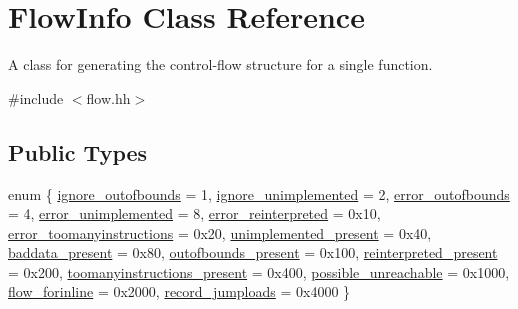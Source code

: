 \hypertarget{class_flow_info}{}\section{Flow\+Info Class Reference}
\label{class_flow_info}


A class for generating the control-\/flow structure for a single function.  




{\ttfamily \#include $<$flow.\+hh$>$}

\subsection*{Public Types}
\begin{DoxyCompactItemize}
\item 
enum \{ \newline
\mbox{\hyperlink{class_flow_info_a76909fdb45a32a5b570e61179bbce0efa28bbd3df72fa1d22f4d1cba5e44e15c3}{ignore\+\_\+outofbounds}} = 1, 
\mbox{\hyperlink{class_flow_info_a76909fdb45a32a5b570e61179bbce0efa36aeebccad195685e73dcb9cfd30b0e5}{ignore\+\_\+unimplemented}} = 2, 
\mbox{\hyperlink{class_flow_info_a76909fdb45a32a5b570e61179bbce0efae0f754081ade3178cf53426e2189cfac}{error\+\_\+outofbounds}} = 4, 
\mbox{\hyperlink{class_flow_info_a76909fdb45a32a5b570e61179bbce0efa5fd70506bccfcdb97b9c714be668a51a}{error\+\_\+unimplemented}} = 8, 
\newline
\mbox{\hyperlink{class_flow_info_a76909fdb45a32a5b570e61179bbce0efa05fc1972b52ac192b30dfea8c2f4d2c7}{error\+\_\+reinterpreted}} = 0x10, 
\mbox{\hyperlink{class_flow_info_a76909fdb45a32a5b570e61179bbce0efa16ca3b61de5548e85ad28fdb221e3f54}{error\+\_\+toomanyinstructions}} = 0x20, 
\mbox{\hyperlink{class_flow_info_a76909fdb45a32a5b570e61179bbce0efae2dfb6d73ffa37e211353b27bb6e60d4}{unimplemented\+\_\+present}} = 0x40, 
\mbox{\hyperlink{class_flow_info_a76909fdb45a32a5b570e61179bbce0efa9c78c0dc3c0876f360432b1ea4895347}{baddata\+\_\+present}} = 0x80, 
\newline
\mbox{\hyperlink{class_flow_info_a76909fdb45a32a5b570e61179bbce0efafd7df0984de9145a0560dddb95f2f040}{outofbounds\+\_\+present}} = 0x100, 
\mbox{\hyperlink{class_flow_info_a76909fdb45a32a5b570e61179bbce0eface3d6862adccc05eb87519854efa8afe}{reinterpreted\+\_\+present}} = 0x200, 
\mbox{\hyperlink{class_flow_info_a76909fdb45a32a5b570e61179bbce0efa3e10e4b2f7c47cb136374cb1d7438260}{toomanyinstructions\+\_\+present}} = 0x400, 
\mbox{\hyperlink{class_flow_info_a76909fdb45a32a5b570e61179bbce0efa6dc22b8a298dc4a3b91ddb7b3574835d}{possible\+\_\+unreachable}} = 0x1000, 
\newline
\mbox{\hyperlink{class_flow_info_a76909fdb45a32a5b570e61179bbce0efa87e8c8e18649576cb22d8285f5a6ebb8}{flow\+\_\+forinline}} = 0x2000, 
\mbox{\hyperlink{class_flow_info_a76909fdb45a32a5b570e61179bbce0efaa2cb6d0ce1856147cf59a4b80d2c0bb8}{record\+\_\+jumploads}} = 0x4000
 \}
\end{DoxyCompactItemize}
